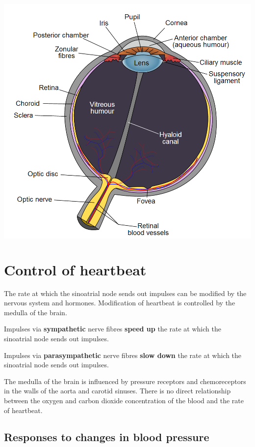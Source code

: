 \documentclass{article}
\begin{document}
\begin{center}
	\includegraphics[scale=0.25]{eye}
\end{center}

\section*{Control of heartbeat}

The rate at which the sinoatrial node sends out impulses can be modified by the
nervous system and hormones. Modification of heartbeat is controlled by the
medulla of the brain.

Impulses via {\bf sympathetic} nerve fibres {\bf speed up} the rate at which the
sinoatrial node sends out impulses.

Impulses via {\bf parasympathetic} nerve fibres {\bf slow down} the rate at
which the sinoatrial node sends out impulses.

The medulla of the brain is influenced by pressure receptors and chemoreceptors
in the walls of the aorta and carotid sinuses. There is no direct relationship
between the oxygen and carbon dioxide concentration of the blood and the rate of
heartbeat.

\subsection*{Responses to changes in blood pressure}
\end{document}
